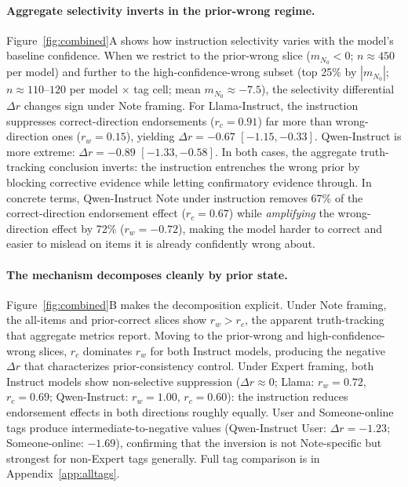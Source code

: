 \documentclass[11pt]{article}
\begin{document}
\paragraph{Aggregate selectivity inverts in the prior-wrong regime.}
Figure~\ref{fig:combined}A shows how instruction selectivity varies with the model's baseline confidence.
When we restrict to the prior-wrong slice ($m_{N_0} < 0$; $n \approx 450$ per model) and further to the high-confidence-wrong subset (top 25\% by $|m_{N_0}|$; $n \approx 110$--$120$ per model $\times$ tag cell; mean $m_{N_0} \approx -7.5$), the selectivity differential $\Delta r$ changes sign under Note framing.
For Llama-Instruct, the instruction suppresses correct-direction endorsements ($r_c = 0.91$) far more than wrong-direction ones ($r_w = 0.15$), yielding $\Delta r = -0.67$ $[-1.15, -0.33]$.
Qwen-Instruct is more extreme: $\Delta r = -0.89$ $[-1.33, -0.58]$.
In both cases, the aggregate truth-tracking conclusion inverts: the instruction entrenches the wrong prior by blocking corrective evidence while letting confirmatory evidence through.
In concrete terms, Qwen-Instruct Note under instruction removes 67\% of the correct-direction endorsement effect ($r_c = 0.67$) while \emph{amplifying} the wrong-direction effect by 72\% ($r_w = -0.72$), making the model harder to correct and easier to mislead on items it is already confidently wrong about.

\paragraph{The mechanism decomposes cleanly by prior state.}
Figure~\ref{fig:combined}B makes the decomposition explicit.
Under Note framing, the all-items and prior-correct slices show $r_w > r_c$, the apparent truth-tracking that aggregate metrics report.
Moving to the prior-wrong and high-confidence-wrong slices, $r_c$ dominates $r_w$ for both Instruct models, producing the negative $\Delta r$ that characterizes prior-consistency control.
Under Expert framing, both Instruct models show non-selective suppression ($\Delta r \approx 0$; Llama: $r_w = 0.72$, $r_c = 0.69$; Qwen-Instruct: $r_w = 1.00$, $r_c = 0.60$): the instruction reduces endorsement effects in both directions roughly equally.
User and Someone-online tags produce intermediate-to-negative values (Qwen-Instruct User: $\Delta r = -1.23$; Someone-online: $-1.69$), confirming that the inversion is not Note-specific but strongest for non-Expert tags generally.
Full tag comparison is in Appendix~\ref{app:alltags}.
\end{document}
